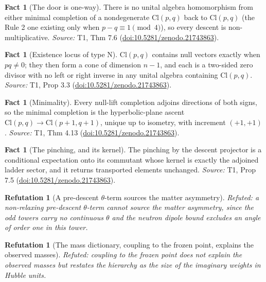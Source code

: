 \documentclass[11pt]{article}
\newtheorem{refutation}[theorem]{Refutation}
\theoremstyle{definition}
\newtheorem{fact}[theorem]{Fact}
\theoremstyle{plain}
\providecommand{\Cl}{}\renewcommand{\Cl}{\mathrm{Cl}}
\begin{document}
\begin{fact}[The door is one-way]\label{c:transport.door-one-way}
There is no unital algebra homomorphism from either minimal completion of a nondegenerate $\Cl(p,q)$ back to $\Cl(p,q)$ (the Rule 2 one existing only when $p - q \equiv 1 \pmod 4$), so every descent is non-multiplicative.
\emph{Source:} T1, Thm 7.6 (\href{https://doi.org/10.5281/zenodo.21743863}{doi:10.5281/zenodo.21743863}).
\end{fact}

\begin{fact}[Existence locus of type N]\label{c:transport.existence-locus-type-n}
$\Cl(p,q)$ contains null vectors exactly when $pq \neq 0$; they then form a cone of dimension $n - 1$, and each is a two-sided zero divisor with no left or right inverse in any unital algebra containing $\Cl(p,q)$.
\emph{Source:} T1, Prop 3.3 (\href{https://doi.org/10.5281/zenodo.21743863}{doi:10.5281/zenodo.21743863}).
\end{fact}

\begin{fact}[Minimality]\label{c:transport.minimality}
Every null-lift completion adjoins directions of both signs, so the minimal completion is the hyperbolic-plane ascent $\Cl(p,q) \to \Cl(p{+}1,q{+}1)$, unique up to isometry, with increment $(+1,+1)$.
\emph{Source:} T1, Thm 4.13 (\href{https://doi.org/10.5281/zenodo.21743863}{doi:10.5281/zenodo.21743863}).
\end{fact}

\begin{fact}[The pinching, and its kernel]\label{c:transport.pinching-kernel}
The pinching by the descent projector is a conditional expectation onto its commutant whose kernel is exactly the adjoined ladder sector, and it returns transported elements unchanged.
\emph{Source:} T1, Prop 7.5 (\href{https://doi.org/10.5281/zenodo.21743863}{doi:10.5281/zenodo.21743863}).
\end{fact}

\begin{refutation}[A pre-descent $\theta$-term sources the matter asymmetry]\label{c:refuted.a-pre-descent-term-sources-the-matter-asymmetry}
Refuted: a non-relaxing pre-descent $\theta$-term cannot source the matter asymmetry, since the odd towers carry no continuous $\theta$ and the neutron dipole bound excludes an angle of order one in this tower.
\end{refutation}

\begin{refutation}[The mass dictionary, coupling to the frozen point, explains the observed masses]\label{c:refuted.the-mass-dictionary-coupling-to-the-frozen-point}
Refuted: coupling to the frozen point does not explain the observed masses but restates the hierarchy as the size of the imaginary weights in Hubble units.
\end{refutation}
\end{document}
